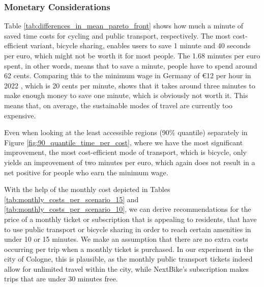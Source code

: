 

\subsubsection{Monetary Considerations}

Table \ref{tab:differences_in_mean_pareto_front} shows how much a minute of saved time costs for cycling and public transport, respectively.
The most cost-efficient variant, bicycle sharing, enables users to save 1 minute and 40 seconds per euro, which might not be worth it for most people.
The 1.68 minutes per euro spent, in other words, means that to save a minute, people have to spend around 62 cents.
Comparing this to the minimum wage in Germany of \euro{12} per hour in 2022 , which is 20 cents per minute, shows that it takes around three minutes to make enough money to save one minute, which is obviously not worth it.
This means that, on average, the sustainable modes of travel are currently too expensive.

Even when looking at the least accessible regions (90\% quantile) separately in Figure \ref{fig:90_quantile_time_per_cost}, where we have the most significant improvement, the most cost-efficient mode of transport, which is bicycle, only yields an improvement of two minutes per euro, which again does not result in a net positive for people who earn the minimum wage.

With the help of the monthly cost depicted in Tables \ref{tab:monthly_costs_per_scenario_15} and \ref{tab:monthly_costs_per_scenario_10}, we can derive recommendations for the price of a monthly ticket or subscription that is appealing to residents, that have to use public transport or bicycle sharing in order to reach certain amenities in under 10 or 15 minutes.
We make an assumption that there are no extra costs occurring per trip when a monthly ticket is purchased.
In our experiment in the city of Cologne, this is plausible, as the monthly public transport tickets indeed allow for unlimited travel within the city, while NextBike's subscription makes trips that are under 30 minutes free.

